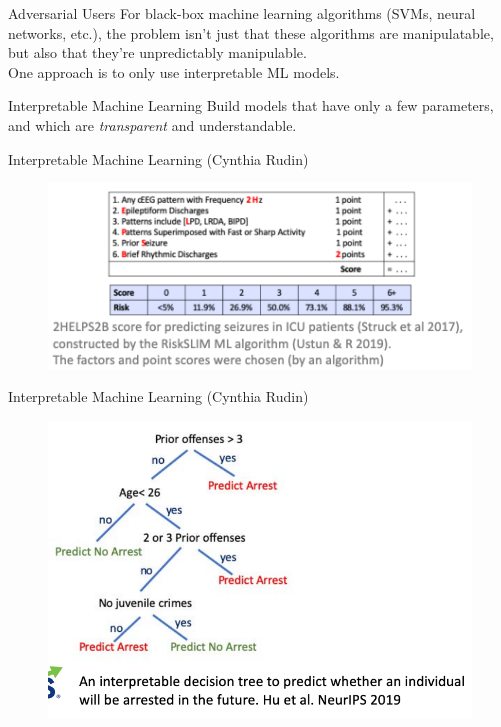 \documentclass[11pt]{beamer}
\begin{document}
\begin{frame}[c]{Adversarial Users}
  For black-box machine learning algorithms (SVMs, neural networks, etc.), the problem isn't just that these algorithms are manipulatable, \pause but also that they're \alert{unpredictably} manipulable.\\
  \vspace{0.1cm}
  \pause One approach is to only use \alert{interpretable ML models.}
\end{frame}

\begin{frame}[c]{Interpretable Machine Learning}
  \pause Build models that have only a few parameters, and which are \emph{transparent} and understandable.
\end{frame}

\begin{frame}[c]{Interpretable Machine Learning (Cynthia Rudin)}
\begin{figure}
  \includegraphics[width=\textwidth]{images/rudin_model.png}
\end{figure}
\end{frame}

\begin{frame}[c]{Interpretable Machine Learning (Cynthia Rudin)}
\begin{figure}
  \includegraphics[width=\textwidth]{images/rudin_model_2.png}
\end{figure}
\end{frame}
\end{document}
